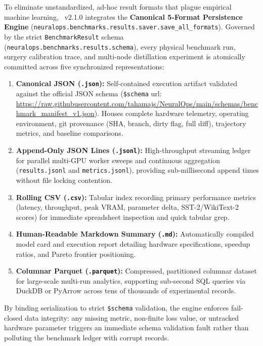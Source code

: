 To eliminate unstandardized, ad-hoc result formats that plague empirical machine learning, \neuralops\ v2.1.0 integrates the \textbf{Canonical 5-Format Persistence Engine} (\texttt{neuralops.benchmarks.results.saver.save\_all\_formats}). Governed by the strict \texttt{BenchmarkResult} schema (\texttt{neuralops.benchmarks.results.schema}), every physical benchmark run, surgery calibration trace, and multi-node distillation experiment is atomically committed across five synchronized representations:
\begin{enumerate}
    \item \textbf{Canonical JSON (\texttt{.json}):} Self-contained execution artifact validated against the official JSON schema (\texttt{\$schema} url: \url{https://raw.githubusercontent.com/tahamajs/NeuralOps/main/schemas/benchmark_manifest_v1.json}). Houses complete hardware telemetry, operating environment, git provenance (SHA, branch, dirty flag, full diff), trajectory metrics, and baseline comparisons.
    \item \textbf{Append-Only JSON Lines (\texttt{.jsonl}):} High-throughput streaming ledger for parallel multi-GPU worker sweeps and continuous aggregation (\texttt{results.jsonl} and \texttt{metrics.jsonl}), providing sub-millisecond append times without file locking contention.
    \item \textbf{Rolling CSV (\texttt{.csv}):} Tabular index recording primary performance metrics (latency, throughput, peak VRAM, parameter delta, SST-2/WikiText-2 scores) for immediate spreadsheet inspection and quick tabular grep.
    \item \textbf{Human-Readable Markdown Summary (\texttt{.md}):} Automatically compiled model card and execution report detailing hardware specifications, speedup ratios, and Pareto frontier positioning.
    \item \textbf{Columnar Parquet (\texttt{.parquet}):} Compressed, partitioned columnar dataset for large-scale multi-run analytics, supporting sub-second SQL queries via DuckDB or PyArrow across tens of thousands of experimental records.
\end{enumerate}
By binding serialization to strict \texttt{\$schema} validation, the engine enforces fail-closed data integrity: any missing metric, non-finite loss value, or untracked hardware parameter triggers an immediate schema validation fault rather than polluting the benchmark ledger with corrupt records.
